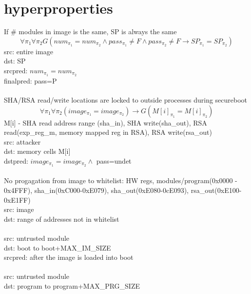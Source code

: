 \documentclass[10pt,openany]{article}
\begin{document}
\section{hyperproperties}
If \# modules in image is the same, SP is always the same
\[\forall \pi_1 \forall \pi_2G(num_{\pi_1}=num_{\pi_2}\land pass_{\pi_1}\neq F\land pass_{\pi_2}\neq F\rightarrow SP_{\pi_1}=SP_{\pi_2})\]
src: entire image\\
dst: SP\\
srcpred: $num_{\pi_1} = num_{\pi_2}$\\
finalpred: pass=P\\\\
%
SHA/RSA read/write locations are locked to outside processes during secureboot
\[\forall \pi_1 \forall \pi_2 (image_{\pi_1}=image_{\pi_2})\rightarrow G(M[i]_{\pi_1}=M[i]_{\pi_2})\]
M[i] - SHA read address range (sha\_in), SHA write(sha\_out), RSA read(exp\_reg\_m, memory mapped reg in RSA), RSA write(rsa\_out)\\
src: attacker\\
dst: memory cells M[i]\\
dstpred: $image_{\pi_1}=image_{\pi_2}\land$ pass=undet\\\\
%
No progagation from image to whitelist: 
HW regs, 
modules/program(0x0000 - 0x4FFF), 
sha\_in(0xC000-0xE079), 
sha\_out(0xE080-0cE093), 
rsa\_out(0xE100-0xE1FF) \\
src: image\\
dst: range of addresses not in whitelist\\\\
%
src: untrusted module\\
dst: boot to boot+MAX\_IM\_SIZE\\
srcpred: after the image is loaded into boot\\\\
%
src: untrusted module\\
dst: program to program+MAX\_PRG\_SIZE
\end{document}
